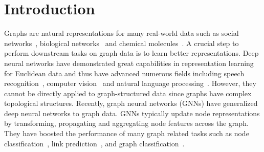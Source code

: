 \documentclass[11pt,dvipdfm]{article}
\begin{document}
\section{Introduction}\label{sec:yiqi_introduction}
Graphs are natural representations for many real-world data such as social networks~\cite{yanardag2015deep,hamilton2017inductive,kipf2016semi,velivckovic2017graph}, biological networks~\cite{borgwardt2005protein,shervashidze2011weisfeiler} and chemical molecules~\cite{gilmer2017neural,rong2020self}. A crucial step to perform downstream tasks on graph data is to learn better representations. Deep neural networks have demonstrated great capabilities in representation learning for Euclidean data and thus have advanced numerous fields including speech recognition~\cite{nassif2019speech}, computer vision~\cite{he2016deep} and natural language processing~\cite{devlin2018bert}. However, they cannot be directly applied to graph-structured data since graphs have complex topological structures. Recently, graph neural networks (GNNs) have generalized deep neural networks to graph data. GNNs typically update node representations by transforming, propagating and aggregating node features across the graph. They have boosted the performance of many graph related tasks such as node classification~\cite{kipf2016semi,hamilton2017inductive}, link prediction~\cite{zhang2018anrl,gao2019graph,vashishth2020compositionbased}, and graph classification~\cite{ying2018hierarchical,ma2019graph,li2020graph,gao2021topology}. 
\end{document}
